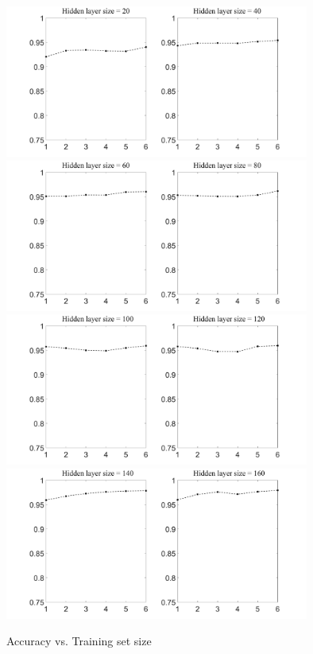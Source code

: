 \documentclass[conference]{IEEEtran}
\begin{document}
\begin{subfigures}
\begin{figure}[tmbh]
\centering
\includegraphics[width=10cm]{AccuracyTSSizeA.pdf}
\includegraphics[width=10cm]{AccuracyTSSizeB.pdf}
\includegraphics[width=10cm]{AccuracyTSSizeC.pdf}
\includegraphics[width=10cm]{AccuracyTSSizeD.pdf}
\caption{Accuracy vs. Training set size}
\label{figure:ATSS_A}
\end{figure}


\end{subfigures}
\end{document}
